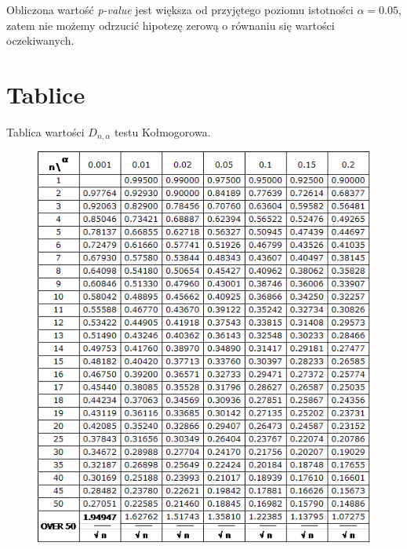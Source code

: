 \documentclass{article}
\begin{document}
Obliczona wartość \textit{p-value} jest większa od przyjętego poziomu istotności $\alpha = 0.05$, zatem nie możemy odrzucić hipotezę zerową o równaniu się wartości oczekiwanych.

\newpage
\section{Tablice}
Tablica wartości $D_{n,\alpha}$ testu Kołmogorowa.
\begin{figure}[h!] \begin{center}
\includegraphics[height=0.5\textheight, angle=0]{"pdf/tablicaK.png"}
\end{center} \end{figure}
\end{document}
